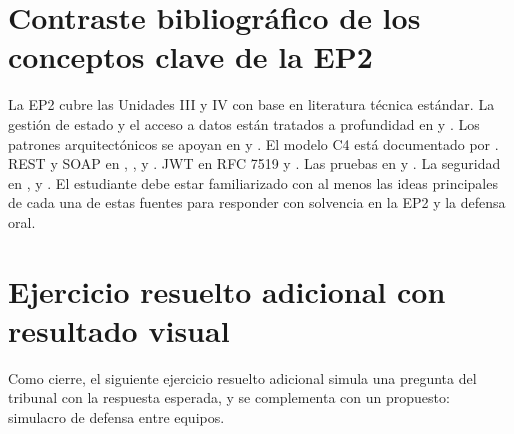 \documentclass[11pt,a4paper,openany]{book}
\begin{document}
\section{Contraste bibliográfico de los conceptos clave de la EP2}

La EP2 cubre las Unidades III y IV con base en literatura técnica
estándar. La gestión de estado y el acceso a datos están tratados a
profundidad en \cite{fowler2002patterns} y \cite{kleppmann2017designing}.
Los patrones arquitectónicos se apoyan en \cite{bass2021software} y
\cite{richards2020fundamentals}. El modelo C4 está documentado por
\cite{brown2023c4}. REST y SOAP en \cite{fielding2000rest},
\cite{richardson2007restful}, \cite{alonso2010webservice} y
\cite{richardson2007restful}. JWT en RFC 7519 \cite{jones2015jwt} y
\cite{jones2015jwt}. Las pruebas en \cite{martin2008clean} y
\cite{martin2017clean}. La seguridad en \cite{owasp2021top10},
\cite{verizon2025dbir} y \cite{ortega2022securecoding}. El
estudiante debe estar familiarizado con al menos las ideas
principales de cada una de estas fuentes para responder con solvencia
en la EP2 y la defensa oral.

\section{Ejercicio resuelto adicional con resultado visual}

Como cierre, el siguiente ejercicio resuelto adicional
simula una pregunta del tribunal con la respuesta esperada, y se
complementa con un propuesto: simulacro de defensa entre equipos.
\end{document}
